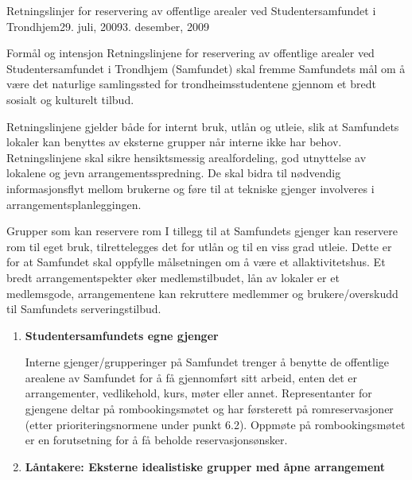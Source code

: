 
\begin{instruks}{Retningslinjer for reservering av offentlige arealer
    ved Studentersamfundet i Trondhjem}{29. juli, 2009}{3. desember, 2009}

    \begin{instruksledd}{Formål og intensjon}
        Retningslinjene for reservering av offentlige arealer ved Studentersamfundet i Trondhjem
        (Samfundet) skal fremme
        Samfundets mål om å være det naturlige samlingssted for trondheimsstudentene gjennom et
        bredt sosialt og kulturelt
        tilbud.


        Retningslinjene gjelder både for internt bruk, utlån og utleie, slik at Samfundets lokaler
        kan benyttes av eksterne
        grupper når interne ikke har behov. Retningslinjene skal sikre hensiktsmessig
        arealfordeling, god utnyttelse av
        lokalene og jevn arrangementsspredning. De skal bidra til nødvendig informasjonsflyt
        mellom brukerne og føre til at
        tekniske gjenger involveres i arrangementsplanleggingen.
    \end{instruksledd}

    \begin{instruksledd}{Grupper som kan reservere rom}
        I tillegg til at Samfundets gjenger kan reservere rom til eget bruk,
        tilrettelegges det for utlån og til en viss grad utleie.
        Dette er for at Samfundet skal oppfylle målsetningen om å være et
        allaktivitetshus. Et bredt arrangementspekter øker
        medlemstilbudet, lån av lokaler er et medlemsgode, arrangementene kan rekruttere
        medlemmer og brukere/overskudd
        til Samfundets serveringstilbud.

        \begin{enumerate}
            \item \textbf{Studentersamfundets egne gjenger}

                Interne gjenger/grupperinger på Samfundet trenger å benytte de offentlige
                arealene av
                Samfundet for å få gjennomført sitt arbeid, enten det er arrangementer,
                vedlikehold, kurs,
                møter eller annet. Representanter for gjengene deltar på rombookingsmøtet
                og har førsterett
                på romreservasjoner (etter prioriteringsnormene under punkt 6.2). Oppmøte
                på
                rombookingsmøtet er en forutsetning for å få beholde reservasjonsønsker.

            \item \textbf{ Låntakere: Eksterne idealistiske grupper med åpne arrangement}


\end{enumerate}
\end{instruksledd}
\end{instruks}
